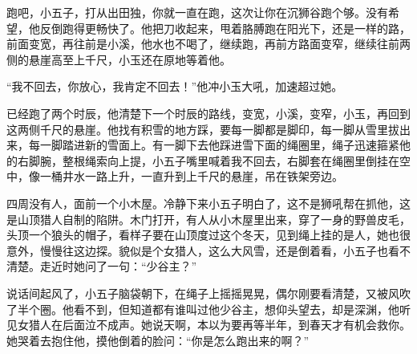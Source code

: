 跑吧，小五子，打从出田独，你就一直在跑，这次让你在沉狮谷跑个够。没有希望，他反倒跑得更畅快了。他把刀收起来，甩着胳膊跑在阳光下，还是一样的路，前面变宽，再往前是小溪，他水也不喝了，继续跑，再前方路面变窄，继续往前两侧的悬崖高至上千尺，小玉还在原地等着他。

“我不回去，你放心，我肯定不回去！”他冲小玉大吼，加速超过她。

已经跑了两个时辰，他清楚下一个时辰的路线，变宽，小溪，变窄，小玉，再回到这两侧千尺的悬崖。他找有积雪的地方踩，要每一脚都是脚印，每一脚从雪里拔出来，每一脚踏进新的雪面上。有一脚下去他踩进雪下面的绳圈里，绳子迅速箍紧他的右脚腕，整根绳索向上提，小五子嘴里喊着我不回去，右脚套在绳圈里倒挂在空中，像一桶井水一路上升，一直升到上千尺的悬崖，吊在铁架旁边。

四周没有人，面前一个小木屋。冷静下来小五子明白了，这不是狮吼帮在抓他，这是山顶猎人自制的陷阱。木门打开，有人从小木屋里出来，穿了一身的野兽皮毛，头顶一个狼头的帽子，看样子要在山顶度过这个冬天，见到绳上挂的是人，她也很意外，慢慢往这边探。貌似是个女猎人，这么大风雪，还是倒着看，小五子也看不清楚。走近时她问了一句：“少谷主？”

说话间起风了，小五子脑袋朝下，在绳子上摇摇晃晃，偶尔刚要看清楚，又被风吹了半个圈。他看不到，但知道都有谁叫过他少谷主，想仰头望去，却是深渊，他听见女猎人在后面泣不成声。她说天啊，本以为要再等半年，到春天才有机会救你。她哭着去抱住他，摸他倒着的脸问：“你是怎么跑出来的啊？”

\newpage